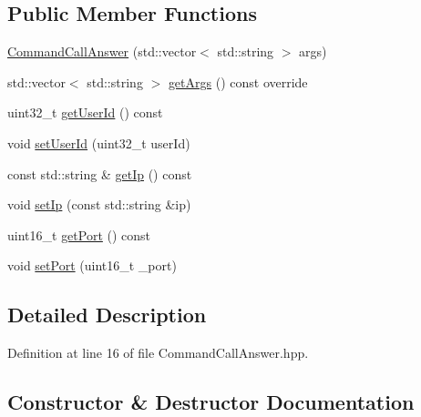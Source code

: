 \subsection*{Public Member Functions}
\begin{DoxyCompactItemize}
\item 
\mbox{\hyperlink{classbabel_1_1common_1_1_command_call_answer_a7ef436e10f629394760b5350b7ee1b64}{Command\+Call\+Answer}} (std\+::vector$<$ std\+::string $>$ args)
\item 
std\+::vector$<$ std\+::string $>$ \mbox{\hyperlink{classbabel_1_1common_1_1_command_call_answer_a5c1c304db1d62ce4a1c231c10daaa58a}{get\+Args}} () const override
\item 
uint32\+\_\+t \mbox{\hyperlink{classbabel_1_1common_1_1_command_call_answer_ad087adbb95d921407eb74f4e3c0cff9d}{get\+User\+Id}} () const
\item 
void \mbox{\hyperlink{classbabel_1_1common_1_1_command_call_answer_a53161bbb9a9126e451cfbfb99a22f633}{set\+User\+Id}} (uint32\+\_\+t user\+Id)
\item 
const std\+::string \& \mbox{\hyperlink{classbabel_1_1common_1_1_command_call_answer_abfe3cbfe8665fe36f079bfed2e5d8c79}{get\+Ip}} () const
\item 
void \mbox{\hyperlink{classbabel_1_1common_1_1_command_call_answer_a82ab2ff7b126e678c70c756b247bdb08}{set\+Ip}} (const std\+::string \&ip)
\item 
uint16\+\_\+t \mbox{\hyperlink{classbabel_1_1common_1_1_command_call_answer_ad1cac368e900d906c5cb64d5ceea79dd}{get\+Port}} () const
\item 
void \mbox{\hyperlink{classbabel_1_1common_1_1_command_call_answer_aaf8c16240892a858af7555fd096e25ba}{set\+Port}} (uint16\+\_\+t \+\_\+port)
\end{DoxyCompactItemize}


\subsection{Detailed Description}


Definition at line 16 of file Command\+Call\+Answer.\+hpp.



\subsection{Constructor \& Destructor Documentation}
\mbox{\label{classbabel_1_1common_1_1_command_call_answer_a7ef436e10f629394760b5350b7ee1b64}} 
